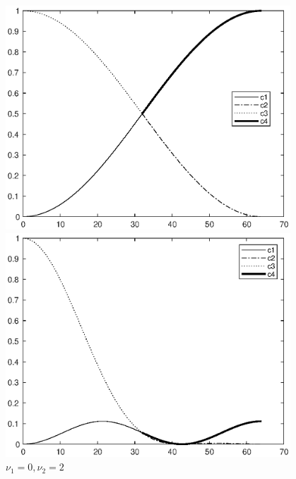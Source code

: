 \documentclass[twoside,a4paper]{article}
\begin{document}
\begin{figure}[H]
    \centering
    \begin{minipage}[t]{0.32\textwidth}
        \centering
        \includegraphics[width=0.95\textwidth]{figure/ex9_41_00.eps}
        \caption*{$\nu_1=0,\nu_2=0$}
    \end{minipage}
    \begin{minipage}[t]{0.32\textwidth}
        \centering
        \includegraphics[width=0.95\textwidth]{figure/ex9_41_02.eps}
        \caption*{$\nu_1=0,\nu_2=2$}
    \end{minipage}
    \begin{minipage}[t]{0.32\textwidth}
        \centering

\end{minipage}
\end{figure}
\end{document}
